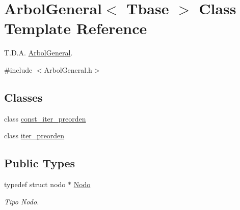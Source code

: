 \hypertarget{class_arbol_general}{}\section{Arbol\+General$<$ Tbase $>$ Class Template Reference}
\label{class_arbol_general}


T.\+D.\+A. \hyperlink{class_arbol_general}{Arbol\+General}.  




{\ttfamily \#include $<$Arbol\+General.\+h$>$}

\subsection*{Classes}
\begin{DoxyCompactItemize}
\item 
class \hyperlink{class_arbol_general_1_1const__iter__preorden}{const\+\_\+iter\+\_\+preorden}
\item 
class \hyperlink{class_arbol_general_1_1iter__preorden}{iter\+\_\+preorden}
\end{DoxyCompactItemize}
\subsection*{Public Types}
\begin{DoxyCompactItemize}
\item 
typedef struct nodo $\ast$ \hyperlink{class_arbol_general_a12cc1b74a9095d89bc7334290d332f7a}{Nodo}
\begin{DoxyCompactList}\small\item\em Tipo Nodo. \end{DoxyCompactList}\end{DoxyCompactItemize}
